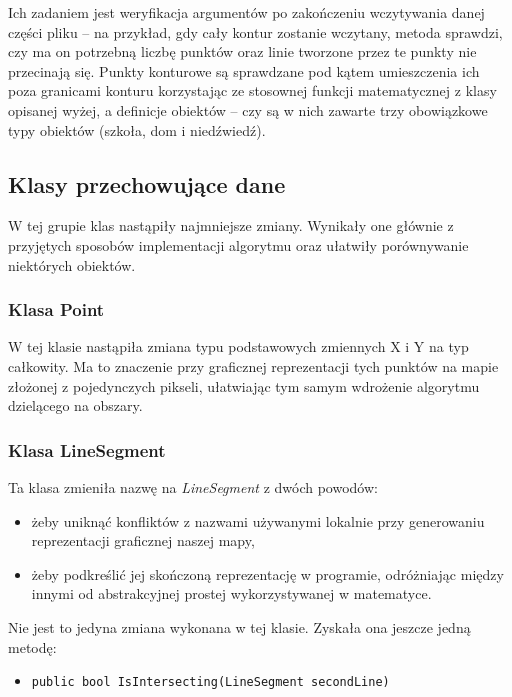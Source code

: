 \documentclass[a4paper,12pt]{article}
\newcommand\tab[1][0.6cm]{\hspace*{#1}}
\begin{document}
Ich zadaniem jest weryfikacja argumentów po zakończeniu wczytywania danej części pliku -- na przykład, gdy cały kontur zostanie wczytany, metoda sprawdzi, czy ma on potrzebną liczbę punktów oraz linie tworzone przez te punkty nie przecinają się. Punkty konturowe są sprawdzane pod kątem umieszczenia ich poza granicami konturu korzystając ze stosownej funkcji matematycznej z klasy opisanej wyżej, a definicje obiektów -- czy są w nich zawarte trzy obowiązkowe typy obiektów (szkoła, dom i niedźwiedź).

\subsection{Klasy przechowujące dane} 

\tab W tej grupie klas nastąpiły najmniejsze zmiany. Wynikały one głównie z przyjętych sposobów implementacji algorytmu oraz ułatwiły porównywanie niektórych obiektów.

\subsubsection{Klasa Point}

\tab W tej klasie nastąpiła zmiana typu podstawowych zmiennych X i Y na typ całkowity. Ma to znaczenie przy graficznej reprezentacji tych punktów na mapie złożonej z pojedynczych pikseli, ułatwiając tym samym wdrożenie algorytmu dzielącego na obszary.

\subsubsection{Klasa LineSegment}

\tab Ta klasa zmieniła nazwę na \textit{LineSegment} z dwóch powodów: 

\begin{itemize}
\item żeby uniknąć konfliktów z nazwami używanymi lokalnie przy generowaniu reprezentacji graficznej naszej mapy,
\item żeby podkreślić jej skończoną reprezentację w programie, odróżniając między innymi od abstrakcyjnej prostej wykorzystywanej w matematyce.
\end{itemize}

Nie jest to jedyna zmiana wykonana w tej klasie. Zyskała ona jeszcze jedną metodę:

\begin{itemize}
\item \begin{lstlisting}
public bool IsIntersecting(LineSegment secondLine)
\end{lstlisting}
\end{itemize}
\end{document}
